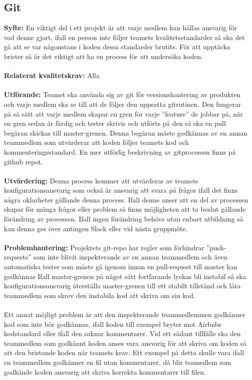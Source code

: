 \documentclass[10pt]{article}
\begin{document}
	\subsection{Git}
	\textbf{Syfte:} En viktigt del i ett projekt är att varje medlem kan hållas ansvarig för vad denne gjort, ifall en person inte följer teamets kvalitetsstandarder så ska det gå att se var någonstans i koden dessa standarder brutits. För att upptäcka brister så är det viktigt att ha en process för att undersöka koden.
	\\\\
	\textbf{Relaterat kvalitetskrav:} Alla
	\\\\
	\textbf{Utförande:} Teamet ska använda sig av git för versionshantering av produkten och varje medlem ska se till att de följer den uppsatta gitrutinen. Den fungerar på så sätt att varje medlem skapar en gren för varje ''feature'' de jobbar på, när en gren sedan är färdig och tester skrivis och utförts på den så ska en pull begäran skickas till master-grenen. Denna begäran måste godkännas av en annan teammedlem som utvärderar att koden följer teamets kod och kommenteringsstandard. En mer utförlig beskrivning av gitprocessen finns på github repot\cite{bib-gitguide}.
	\\\\
	\textbf{Utvärdering:} Denna process kommer att utvärderas av teamets konfigurationsansvarig som också är ansvarig att svara på frågor ifall det finns några oklarheter gällande denna process. Ifall denne anser att en del av processen skapar för många frågor eller problem så finns möjligheten att ta beslut gällande förändring av processen. Ifall ingen förändring behövs utan enbart utbildning så kan denna ges över antingen Slack eller vid nästa gruppmöte.
	\\\\
	\textbf{Problemhantering:} Projektets git-repo har regler som förhindrar ''push-requests'' som inte blivit inspekterande av en annan teammedlem och även automatiska tester som måste gå igenom innan en pull-request till master kan godkännas Ifall master-grenen på något sätt fortfarande lyckas bli instabil så ska konfigurationsansvarig återställa master-grenen till ett stabilt tillstånd och låta teammedlem som skrev den instabila kod att skriva om sin kod.\\\\
	Ett annat möjligt problem är att den inspekterande teammedlemmen godkänner kod som inte bör godkännas, ifall koden till exempel bryter mot Airbnbs kodstandard eller ifall den saknar kommentarer. Vid ett sådant tillfälle ska den teammedlem som godkännt koden anses vara ansvarig för att skriva om koden så att den bristande koden når teamets krav. Ett exempel på detta skulle vara ifall en teammedlem godkänner en fil utan kommentarer, då blir teamedlem som godkände koden ansvarig att skriva korrekta kommentarer till filen.
\end{document}
